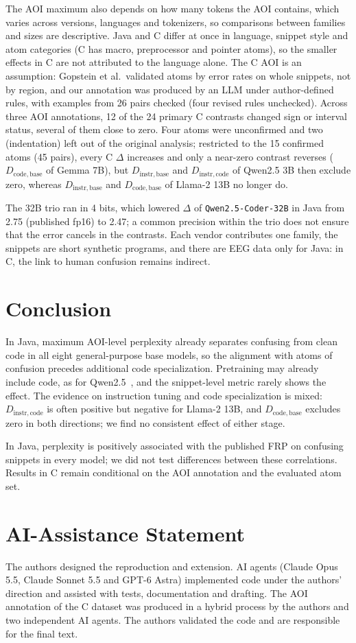 \documentclass[sigconf,nonacm]{acmart}
\renewcommand{\texttt}[1]{\nolinkurl{#1}}
\newcommand{\Dcb}{D_{\mathrm{code},\mathrm{base}}}
\newcommand{\Dic}{D_{\mathrm{instr},\mathrm{code}}}
\newcommand{\Dib}{D_{\mathrm{instr},\mathrm{base}}}
\begin{document}
The AOI maximum also depends on how many tokens the AOI contains, which varies across versions, languages and tokenizers, so comparisons between families and sizes are descriptive.
Java and C differ at once in language, snippet style and atom categories (C has macro, preprocessor and pointer atoms), so the smaller effects in C are not attributed to the language alone.
The C AOI is an assumption: Gopstein et al.\ validated atoms by error rates on whole snippets, not by region, and our annotation was produced by an LLM under author-defined rules, with examples from 26 pairs checked (four revised rules unchecked). Across three AOI annotations, 12 of the 24 primary C contrasts changed sign or interval status, several of them close to zero.
Four atoms were unconfirmed and two (indentation) left out of the original analysis; restricted to the 15 confirmed atoms (45 pairs), every C $\Delta$ increases and only a near-zero contrast reverses ($\Dcb$ of Gemma 7B), but $\Dib$ and $\Dic$ of Qwen2.5 3B then exclude zero, whereas $\Dib$ and $\Dcb$ of Llama-2 13B no longer do.

The 32B trio ran in 4 bits, which lowered $\Delta$ of \texttt{Qwen2.5-Coder-32B} in Java from 2.75 (published fp16) to 2.47; a common precision within the trio does not ensure that the error cancels in the contrasts.
Each vendor contributes one family, the snippets are short synthetic programs, and there are EEG data only for Java: in C, the link to human confusion remains indirect.

\section{Conclusion}
In Java, maximum AOI-level perplexity already separates confusing from clean code in all eight general-purpose base models, so the alignment with atoms of confusion precedes additional code specialization. Pretraining may already include code, as for Qwen2.5~\cite{qwen25}, and the snippet-level metric rarely shows the effect.
The evidence on instruction tuning and code specialization is mixed: $\Dic$ is often positive but negative for Llama-2 13B, and $\Dcb$ excludes zero in both directions; we find no consistent effect of either stage.

In Java, perplexity is positively associated with the published FRP on confusing snippets in every model; we did not test differences between these correlations. Results in C remain conditional on the AOI annotation and the evaluated atom set.

\section*{AI-Assistance Statement}
The authors designed the reproduction and extension.
AI agents (Claude Opus 5.5, Claude Sonnet 5.5 and GPT-6 Astra) implemented code under the authors' direction and assisted with tests, documentation and drafting.
The AOI annotation of the C dataset was produced in a hybrid process by the authors and two independent AI agents.
The authors validated the code and are responsible for the final text.
\end{document}
